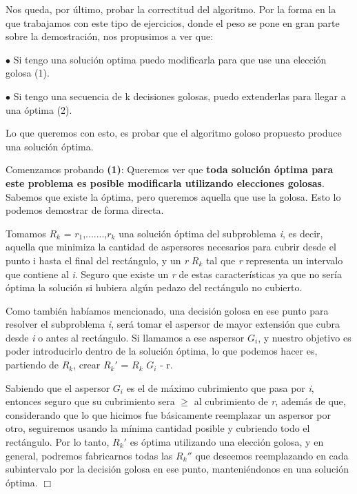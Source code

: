 Nos queda, por último, probar la correctitud del algoritmo. Por la forma en la que trabajamos con este tipo de ejercicios, donde el peso se pone en gran parte sobre la demostración, nos propusimos a ver que: \newline

$\bullet$ Si tengo una solución optima puedo modificarla para que use una elección golosa (1). \newline

$\bullet$ Si tengo una secuencia de k decisiones golosas, puedo extenderlas para llegar a una óptima (2).\newline

Lo que queremos con esto, es probar que el algoritmo goloso propuesto produce una solución óptima. \newline \newline 

Comenzamos probando \textbf{(1)}: Queremos ver que \textbf{toda solución óptima para este problema es posible modificarla utilizando elecciones golosas}. Sabemos que existe la óptima, pero queremos aquella que use la golosa. Esto lo podemos demostrar de forma directa. \newline 

Tomamos $R_{k}$ = $r_{1}$,.......,$r_{k}$ una solución óptima del subproblema \textit{i}, es decir, aquella que minimiza la cantidad de aspersores necesarios para cubrir desde el punto i hasta el final del rectángulo, y un \textit{r} \in $ R_{k}$ tal que \textit{r} representa un intervalo que contiene al \textit{i}. Seguro que existe un \textit{r} de estas características ya que no sería óptima la solución si hubiera algún pedazo del rectángulo no cubierto. \newline

Como también habíamos mencionado, una decisión golosa en ese punto para resolver el subproblema \textit{i}, será tomar el aspersor de mayor extensión que cubra desde \textit{i} o antes al rectángulo.
Si llamamos a ese aspersor $G_{i}$, y nuestro objetivo es poder introducirlo dentro de la solución óptima, lo que podemos hacer es, partiendo de $ R_{k}$, crear $ R_{k}'$  = $ R_{k}$ \cup $ G_{i}$ - r. \newline 

Sabiendo que el aspersor $G_{i}$ es el de máximo cubrimiento que pasa por \textit{i}, entonces seguro que su cubrimiento sera $\geq$ al cubrimiento de \textit{r}, además de que, considerando que lo que hicimos fue básicamente reemplazar un aspersor por otro, seguiremos usando la mínima cantidad posible y cubriendo todo el rectángulo. Por lo tanto, $ R_{k}'$ es óptima utilizando una elección golosa, y en general, podremos fabricarnos todas las $ R_{k}''$ que deseemos reemplazando en cada subintervalo por la decisión golosa en ese punto, manteniéndonos en una solución óptima.
{\qedwhite}{\hfill \ensuremath{\Box}} \newline\newline

